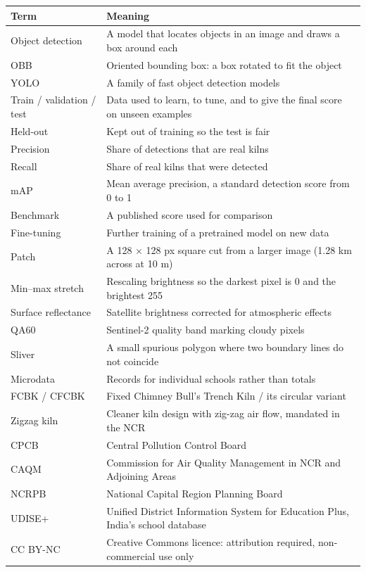 \documentclass[11pt,a4paper]{article}
\begin{document}
{\small
\begin{longtable}{@{}P{3.6cm} P{10.6cm}@{}}
\toprule
Term & Meaning \\
\midrule
\endhead
Object detection & A model that locates objects in an image and draws a box around each \\
OBB & Oriented bounding box: a box rotated to fit the object \\
YOLO & A family of fast object detection models \\
Train / validation / test & Data used to learn, to tune, and to give the final score on unseen examples \\
Held-out & Kept out of training so the test is fair \\
Precision & Share of detections that are real kilns \\
Recall & Share of real kilns that were detected \\
mAP & Mean average precision, a standard detection score from 0 to 1 \\
Benchmark & A published score used for comparison \\
Fine-tuning & Further training of a pretrained model on new data \\
Patch & A 128 $\times$ 128 px square cut from a larger image (1.28 km across at 10 m) \\
Min--max stretch & Rescaling brightness so the darkest pixel is 0 and the brightest 255 \\
Surface reflectance & Satellite brightness corrected for atmospheric effects \\
QA60 & Sentinel-2 quality band marking cloudy pixels \\
Sliver & A small spurious polygon where two boundary lines do not coincide \\
Microdata & Records for individual schools rather than totals \\
FCBK / CFCBK & Fixed Chimney Bull's Trench Kiln / its circular variant \\
Zigzag kiln & Cleaner kiln design with zig-zag air flow, mandated in the NCR \\
CPCB & Central Pollution Control Board \\
CAQM & Commission for Air Quality Management in NCR and Adjoining Areas \\
NCRPB & National Capital Region Planning Board \\
UDISE+ & Unified District Information System for Education Plus, India's school database \\
CC BY-NC & Creative Commons licence: attribution required, non-commercial use only \\

\end{longtable}}
\end{document}
